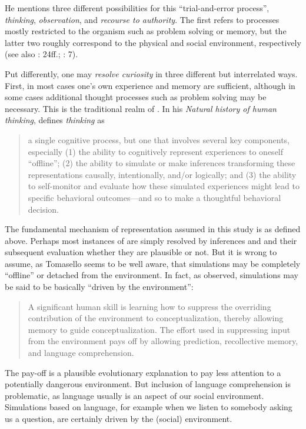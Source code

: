\noindent He mentions three different possibilities for this “trial-and-error process”, \textit{thinking}, \textit{observation}, and \textit{recourse to authority}. The first refers to processes mostly restricted to the organism such as problem solving or memory, but the latter two roughly correspond to the physical and social environment, respectively (see also \citealt{Lewin1936}: 24ff.; \citealt{SteffensenFill2014}: 7).

Put differently, one may \textit{resolve curiosity} in three different but interrelated ways. First, in most cases one’s own experience and memory are sufficient, although in some cases additional thought processes such as problem solving may be necessary. This is the traditional realm of . In his \textit{Natural history of human thinking}, \citet{Tomasello2014a} defines \textit{thinking} as

\begin{quote}
a single cognitive process, but one that involves several key components, especially (1) the ability to cognitively represent experiences to oneself “offline”; (2) the ability to simulate or make inferences transforming these representations causally, intentionally, and/or logically; and (3) the ability to self-monitor and evaluate how these simulated experiences might lead to specific behavioral outcomes---and so to make a thoughtful behavioral decision.
\end{quote}

\noindent The fundamental mechanism of representation assumed in this study is  as defined above. Perhaps most instances of  are simply resolved by inferences and  and their subsequent evaluation whether they are plausible or not. But it is wrong to assume, as Tomasello seems to be well aware, that simulations may be completely “offline” or detached from the environment. In fact, as \citet[1]{Glenberg1997} observed, simulations may be said to be basically “driven by the environment”:

\begin{quote}
A significant human skill is learning how to suppress the overriding contribution of the environment to conceptualization, thereby allowing memory to guide conceptualization. The effort used in suppressing input from the environment pays off by allowing prediction, recollective memory, and language comprehension. \end{quote}

\noindent The pay-off is a plausible evolutionary explanation to pay less attention to a potentially dangerous environment. But  inclusion of language comprehension is problematic, as language usually is an aspect of our social environment. Simulations based on language, for example when we listen to somebody asking us a question, are certainly driven by the (social) environment.


